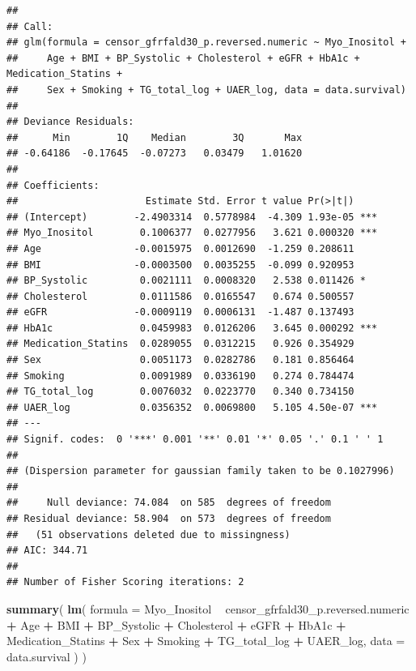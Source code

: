 \documentclass[]{article}
\newenvironment{Shaded}{\begin{snugshade}}{\end{snugshade}}
\newcommand{\DataTypeTok}[1]{\textcolor[rgb]{0.13,0.29,0.53}{#1}}
\newcommand{\KeywordTok}[1]{\textcolor[rgb]{0.13,0.29,0.53}{\textbf{#1}}}
\newcommand{\NormalTok}[1]{#1}
\newcommand{\OperatorTok}[1]{\textcolor[rgb]{0.81,0.36,0.00}{\textbf{#1}}}
\newcommand{\StringTok}[1]{\textcolor[rgb]{0.31,0.60,0.02}{#1}}
\begin{document}
\begin{verbatim}
## 
## Call:
## glm(formula = censor_gfrfald30_p.reversed.numeric ~ Myo_Inositol + 
##     Age + BMI + BP_Systolic + Cholesterol + eGFR + HbA1c + Medication_Statins + 
##     Sex + Smoking + TG_total_log + UAER_log, data = data.survival)
## 
## Deviance Residuals: 
##      Min        1Q    Median        3Q       Max  
## -0.64186  -0.17645  -0.07273   0.03479   1.01620  
## 
## Coefficients:
##                      Estimate Std. Error t value Pr(>|t|)    
## (Intercept)        -2.4903314  0.5778984  -4.309 1.93e-05 ***
## Myo_Inositol        0.1006377  0.0277956   3.621 0.000320 ***
## Age                -0.0015975  0.0012690  -1.259 0.208611    
## BMI                -0.0003500  0.0035255  -0.099 0.920953    
## BP_Systolic         0.0021111  0.0008320   2.538 0.011426 *  
## Cholesterol         0.0111586  0.0165547   0.674 0.500557    
## eGFR               -0.0009119  0.0006131  -1.487 0.137493    
## HbA1c               0.0459983  0.0126206   3.645 0.000292 ***
## Medication_Statins  0.0289055  0.0312215   0.926 0.354929    
## Sex                 0.0051173  0.0282786   0.181 0.856464    
## Smoking             0.0091989  0.0336190   0.274 0.784474    
## TG_total_log        0.0076032  0.0223770   0.340 0.734150    
## UAER_log            0.0356352  0.0069800   5.105 4.50e-07 ***
## ---
## Signif. codes:  0 '***' 0.001 '**' 0.01 '*' 0.05 '.' 0.1 ' ' 1
## 
## (Dispersion parameter for gaussian family taken to be 0.1027996)
## 
##     Null deviance: 74.084  on 585  degrees of freedom
## Residual deviance: 58.904  on 573  degrees of freedom
##   (51 observations deleted due to missingness)
## AIC: 344.71
## 
## Number of Fisher Scoring iterations: 2
\end{verbatim}

\begin{Shaded}
\begin{Highlighting}[]
\KeywordTok{summary}\NormalTok{(}
  \KeywordTok{lm}\NormalTok{(}
    \DataTypeTok{formula =}
\NormalTok{      Myo_Inositol }\OperatorTok{~}\StringTok{ }
\StringTok{      }\NormalTok{censor_gfrfald30_p.reversed.numeric }\OperatorTok{+}\StringTok{ }
\StringTok{      }\NormalTok{Age }\OperatorTok{+}
\StringTok{      }\NormalTok{BMI }\OperatorTok{+}\StringTok{ }
\StringTok{      }\NormalTok{BP_Systolic }\OperatorTok{+}\StringTok{ }
\StringTok{      }\NormalTok{Cholesterol }\OperatorTok{+}\StringTok{ }
\StringTok{      }\NormalTok{eGFR }\OperatorTok{+}\StringTok{ }
\StringTok{      }\NormalTok{HbA1c }\OperatorTok{+}
\StringTok{      }\NormalTok{Medication_Statins }\OperatorTok{+}
\StringTok{      }\NormalTok{Sex }\OperatorTok{+}\StringTok{  }
\StringTok{      }\NormalTok{Smoking }\OperatorTok{+}\StringTok{ }
\StringTok{      }\NormalTok{TG_total_log }\OperatorTok{+}
\StringTok{      }\NormalTok{UAER_log, }
    \DataTypeTok{data =}\NormalTok{ data.survival}
\NormalTok{  )}
\NormalTok{)}
\end{Highlighting}
\end{Shaded}
\end{document}
